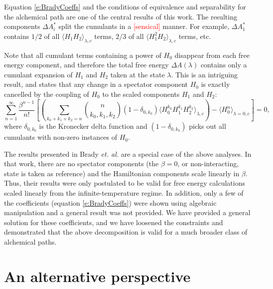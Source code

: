 \documentclass[%
 preprint,
 amsmath,amssymb,
 aps,
]{revtex4-1}
\newcommand{\warning}[1]{{\textsf{{\textcolor{red}{{[#1]}{}}}}}}
\begin{document}
Equation \ref{e:BradyCoeffs} and the conditions of equivalence and separability for the alchemical path are one of the central results of this work. The resulting components $\Delta A^*_i$ split the cumulants in a \warning{sensical} manner.  For example, $\Delta A^*_1$ contains $1/2$ of all $\langle  H_1 H_2\rangle_{\lambda,c}$ terms, $2/3$ of all $\langle  H_1^2 H_2\rangle_{\lambda,c}$ terms, etc. 

Note that all cumulant terms containing a power of $H_0$ disappear from each free energy component, and therefore 
the total free energy $\Delta A (\lambda) $ contains only a cumulant expansion of $H_1$ and $H_2$ taken at the state $\lambda$. 
This is an intriguing result, and states that any change in a spectator component $H_0$ is exactly cancelled by the coupling of $H_0$ to the scaled components $H_1$ and $H_2$:
 \begin{equation}
\sum_{n=1}^{\infty}  \frac{\beta^{n-1}}{n!} 
\left[
\left(
 \sum_{k_0+k_1+k_2=n} 
{ n \choose k_0,k_1,k_2 } \left( 1- \delta_{0,k_0}  \right) \langle  H_0^{k_0} H_1^{k_1} H_2^{k_2} \rangle_{\lambda,c}
\right)
-  \langle  H_0^{n}  \rangle_{\lambda=0,c} \right] = 0,
\label{e:SpectatorCancellation}
\end{equation}
where $\delta_{0,k_0} $ is the Kronecker delta function and $ \left( 1- \delta_{0,k_0}  \right)$ picks out all cumulants with non-zero instances of $H_0$. 

The results presented in Brady \emph{et. al.}\cite{Brady:1996gm} are a special case of the above analyses.  In that work, there are no spectator components (the $\beta=0$, or non-interacting, state is taken as reference) and the Hamiltonian components scale linearly in $\beta$.  Thus, their results were only postulated to be valid for free energy calculations scaled linearly from the infinite-temperature regime.  In addition, only a  few of the coefficients (equation \ref{e:BradyCoeffs}) were shown using algebraic manipulation and a general result was not provided.  We have provided a general solution for these coefficients, and we have loosened the constraints and demonstrated that the above decomposition is valid for a much broader class of alchemical paths.


\section{An alternative perspective}
\end{document}
